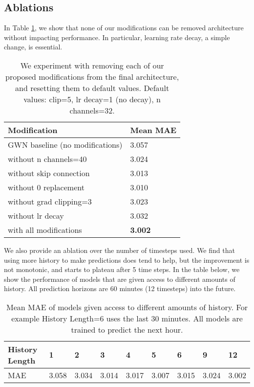 \documentclass[10pt]{article}
\begin{document}
\subsection{Ablations}

In Table \ref{mods}, we show that none of our modifications can be removed architecture without impacting performance. In particular, learning rate decay, a simple change, is essential.
\begin{table}[!htbp]
\centering
\begin{tabular}{@{}ll@{}}
\toprule
Modification          & Mean MAE \\ \midrule
GWN baseline (no modifications)              & 3.057    \\
without n channels=40          & 3.024    \\
without skip connection & 3.013    \\
without 0 replacement & 3.010  \\
without grad clipping=3        & 3.023    \\
without lr decay      & 3.032    \\
with all modifications            & \textbf{3.002} \\ \bottomrule
\end{tabular}
\caption{We experiment with removing each of our proposed modifications from the final architecture, and resetting them to default values. Default values: clip=5, lr decay=1 (no decay), n channels=32.}
\label{mods}
\end{table}

We also provide an ablation over the number of timesteps used. We find that using more history to make predictions does tend to help, but the improvement is not monotonic, and starts to plateau after 5 time steps.  In the table below, we show the performance of models that are given access to different amounts of history. All prediction horizons are 60 minutes (12 timesteps) into the future.

\begin{table}[H]
\centering
\begin{tabular}{@{}lllllllll@{}}
\toprule
History Length & 1     & 2     & 3     & 4     & 5     & 6     & 9     & 12  \\ \midrule
MAE            & 3.058 & 3.034 & 3.014 & 3.017 & 3.007 & 3.015 & 3.024 & 3.002 \\ \bottomrule
\end{tabular}
\caption{Mean MAE of models given access to different amounts of history. For example History Length=6 uses the last 30 minutes. All models are trained to predict the next hour.}
\label{history}
\end{table}
\end{document}
